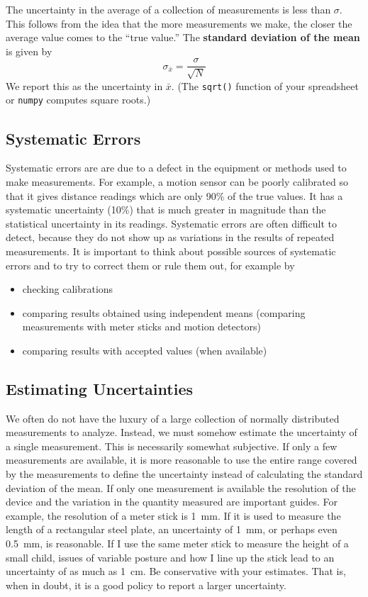 \documentclass[12pt]{article}
\begin{document}
The uncertainty in the average of a collection of measurements is less
than $\sigma$. This follows from the idea that the more measurements
we make, the closer the average value comes to the ``true value.'' The
\textbf{standard deviation of the mean} is given by 
\begin{equation}
\sigma_{\bar{x}} = \frac{\sigma}{\sqrt{N}} 
\end{equation}
We report this as the uncertainty in $\bar{x}$. (The \texttt{sqrt()} function
of your spreadsheet or \texttt{numpy} computes square roots.)

\subsection*{Systematic Errors}

Systematic errors are are due to a defect in the equipment or methods
used to make measurements. For example, a motion sensor can be poorly
calibrated so that it gives distance readings which are only 90\% of
the true values. It has a systematic uncertainty (10\%) that is much
greater in magnitude than the statistical uncertainty in its
readings. Systematic errors are often difficult to detect, because
they do not show up as variations in the results of repeated
measurements. It is important to think about possible sources of
systematic errors and to try to correct them or rule them out, for
example by 
\begin{itemize}
\item checking calibrations
\item comparing results obtained using independent means (comparing
  measurements with meter sticks and motion detectors)
\item comparing results with accepted values (when available)
\end{itemize}

\subsection*{Estimating Uncertainties}

We often do not have the luxury of a large collection of normally
distributed measurements to analyze. Instead, we must somehow estimate
the uncertainty of a single measurement. This is necessarily somewhat
subjective. If only a few measurements are available, it is more
reasonable to use the entire range covered by the measurements to
define the uncertainty instead of calculating the standard deviation
of the mean. If only one measurement is available the resolution of
the device and the variation in the quantity measured are important
guides. For example, the resolution of a meter stick is 1~mm. If it is
used to measure the length of a rectangular steel plate, an
uncertainty of 1~mm, or perhaps even 0.5~mm, is reasonable. If I use
the same meter stick to measure the height of a small child, issues
of variable posture and how I line up the stick lead to an uncertainty
of as much as 1~cm. Be conservative with your estimates. That is, when
in doubt, it is a good policy to report a larger uncertainty.
\end{document}
